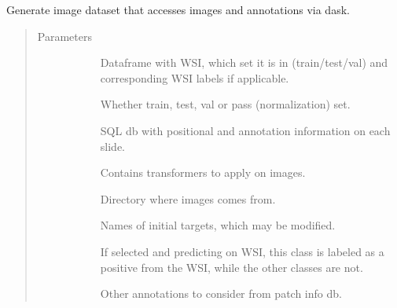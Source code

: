 \documentclass[letterpaper,10pt,english]{sphinxmanual}
\begin{document}
\begin{fulllineitems}
\label{\detokenize{index:pathflowai.datasets.DynamicImageDataset}}
Generate image dataset that accesses images and annotations via dask.
\begin{quote}\begin{description}
\item[{Parameters}] \leavevmode\begin{description}
\item[{}] \leavevmode
Dataframe with WSI, which set it is in (train/test/val) and corresponding WSI labels if applicable.

\item[{}] \leavevmode
Whether train, test, val or pass (normalization) set.

\item[{}] \leavevmode
SQL db with positional and annotation information on each slide.

\item[{}] \leavevmode
Contains transformers to apply on images.

\item[{}] \leavevmode
Directory where images comes from.

\item[{}] \leavevmode
Names of initial targets, which may be modified.

\item[{}] \leavevmode
If selected and predicting on WSI, this class is labeled as a positive from the WSI, while the other classes are not.

\item[{}] \leavevmode
Other annotations to consider from patch info db.


\end{description}
\end{description}
\end{quote}
\end{fulllineitems}
\end{document}
